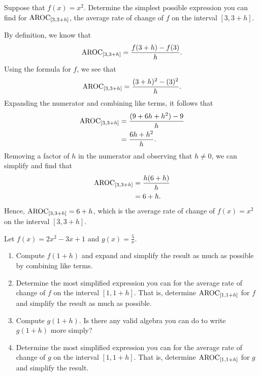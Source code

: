 \documentclass{ximera}
\begin{document}
\begin{example}
Suppose that $f(x) = x^2$.  Determine the simplest possible expression you can find for $\mathrm{AROC}_{[3,3+h]}$, the average rate of change of $f$ on the interval $[3,3+h]$.

\begin{explanation}
By definition, we know that%
\begin{equation*}
\mathrm{AROC}_{[3,3+h]} = \frac{f(3+h)-f(3)}{h}.
\end{equation*}
Using the formula for $f$, we see that%
\begin{equation*}
\mathrm{AROC}_{[3,3+h]} = \frac{(3+h)^2-(3)^2}{h}.
\end{equation*}
Expanding the numerator and combining like terms, it follows that%
\begin{align*}
\mathrm{AROC}_{[3,3+h]} &= \frac{(9+6h+h^2)-9}{h}\\
&= \frac{6h + h^2}{h}\text{.}
\end{align*}
Removing a factor of $h$ in the numerator and observing that $h \ne 0$, we can simplify and find that%
\begin{align*}
\mathrm{AROC}_{[3,3+h]} &= \frac{h(6 + h)}{h}\\
&= 6+h\text{.}
\end{align*}
Hence, $\mathrm{AROC}_{[3,3+h]} = 6+h$, which is the average rate of change of $f(x) = x^2$ on the interval $[3,3+h]$.  
\end{explanation}

\end{example}

\begin{exploration}
Let $f(x) = 2x^2 - 3x + 1$ and $g(x) = \frac{5}{x}$.%
\begin{enumerate}[label=\alph*.]
\item Compute $f(1+h)$ and expand and simplify the result as much as possible by combining like terms.
\item Determine the most simplified expression you can for the average rate of change of $f$ on the interval $[1,1+h]$. That is, determine $\mathrm{AROC}_{[1,1+h]}$ for $f$ and simplify the result as much as possible.
\item Compute $g(1+h)$. Is there any valid algebra you can do to write $g(1+h)$ more simply?
\item Determine the most simplified expression you can for the average rate of change of $g$ on the interval $[1,1+h]$. That is, determine $\mathrm{AROC}_{[1,1+h]}$ for $g$ and simplify the result.
\end{enumerate}
\end{exploration}
\end{document}
